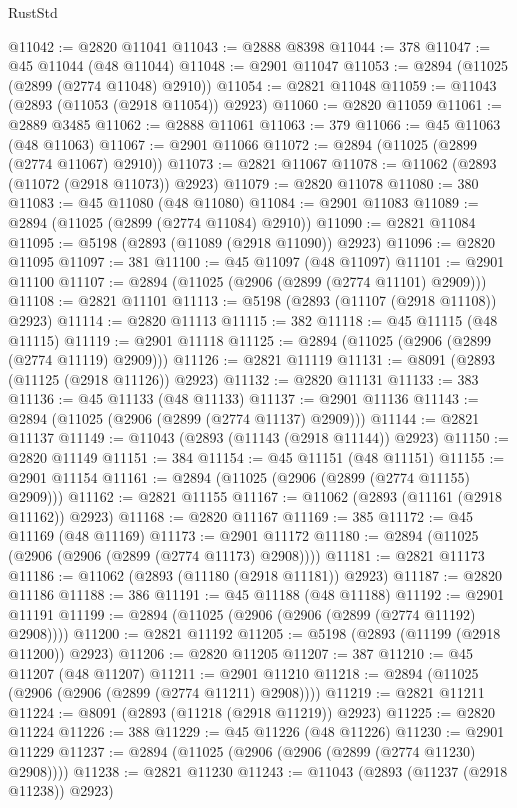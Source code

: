 \begin{lexlean}{RustStd}
\begin{coremodule}
@11042 := @2820 @11041
@11043 := @2888 @8398
@11044 := 378
@11047 := @45 @11044 (@48 @11044)
@11048 := @2901 @11047
@11053 := @2894 (@11025 (@2899 (@2774 @11048) @2910))
@11054 := @2821 @11048
@11059 := @11043 (@2893 (@11053 (@2918 @11054)) @2923)
@11060 := @2820 @11059
@11061 := @2889 @3485
@11062 := @2888 @11061
@11063 := 379
@11066 := @45 @11063 (@48 @11063)
@11067 := @2901 @11066
@11072 := @2894 (@11025 (@2899 (@2774 @11067) @2910))
@11073 := @2821 @11067
@11078 := @11062 (@2893 (@11072 (@2918 @11073)) @2923)
@11079 := @2820 @11078
@11080 := 380
@11083 := @45 @11080 (@48 @11080)
@11084 := @2901 @11083
@11089 := @2894 (@11025 (@2899 (@2774 @11084) @2910))
@11090 := @2821 @11084
@11095 := @5198 (@2893 (@11089 (@2918 @11090)) @2923)
@11096 := @2820 @11095
@11097 := 381
@11100 := @45 @11097 (@48 @11097)
@11101 := @2901 @11100
@11107 := @2894 (@11025 (@2906 (@2899 (@2774 @11101) @2909)))
@11108 := @2821 @11101
@11113 := @5198 (@2893 (@11107 (@2918 @11108)) @2923)
@11114 := @2820 @11113
@11115 := 382
@11118 := @45 @11115 (@48 @11115)
@11119 := @2901 @11118
@11125 := @2894 (@11025 (@2906 (@2899 (@2774 @11119) @2909)))
@11126 := @2821 @11119
@11131 := @8091 (@2893 (@11125 (@2918 @11126)) @2923)
@11132 := @2820 @11131
@11133 := 383
@11136 := @45 @11133 (@48 @11133)
@11137 := @2901 @11136
@11143 := @2894 (@11025 (@2906 (@2899 (@2774 @11137) @2909)))
@11144 := @2821 @11137
@11149 := @11043 (@2893 (@11143 (@2918 @11144)) @2923)
@11150 := @2820 @11149
@11151 := 384
@11154 := @45 @11151 (@48 @11151)
@11155 := @2901 @11154
@11161 := @2894 (@11025 (@2906 (@2899 (@2774 @11155) @2909)))
@11162 := @2821 @11155
@11167 := @11062 (@2893 (@11161 (@2918 @11162)) @2923)
@11168 := @2820 @11167
@11169 := 385
@11172 := @45 @11169 (@48 @11169)
@11173 := @2901 @11172
@11180 := @2894 (@11025 (@2906 (@2906 (@2899 (@2774 @11173) @2908))))
@11181 := @2821 @11173
@11186 := @11062 (@2893 (@11180 (@2918 @11181)) @2923)
@11187 := @2820 @11186
@11188 := 386
@11191 := @45 @11188 (@48 @11188)
@11192 := @2901 @11191
@11199 := @2894 (@11025 (@2906 (@2906 (@2899 (@2774 @11192) @2908))))
@11200 := @2821 @11192
@11205 := @5198 (@2893 (@11199 (@2918 @11200)) @2923)
@11206 := @2820 @11205
@11207 := 387
@11210 := @45 @11207 (@48 @11207)
@11211 := @2901 @11210
@11218 := @2894 (@11025 (@2906 (@2906 (@2899 (@2774 @11211) @2908))))
@11219 := @2821 @11211
@11224 := @8091 (@2893 (@11218 (@2918 @11219)) @2923)
@11225 := @2820 @11224
@11226 := 388
@11229 := @45 @11226 (@48 @11226)
@11230 := @2901 @11229
@11237 := @2894 (@11025 (@2906 (@2906 (@2899 (@2774 @11230) @2908))))
@11238 := @2821 @11230
@11243 := @11043 (@2893 (@11237 (@2918 @11238)) @2923)

\end{coremodule}
\end{lexlean}
